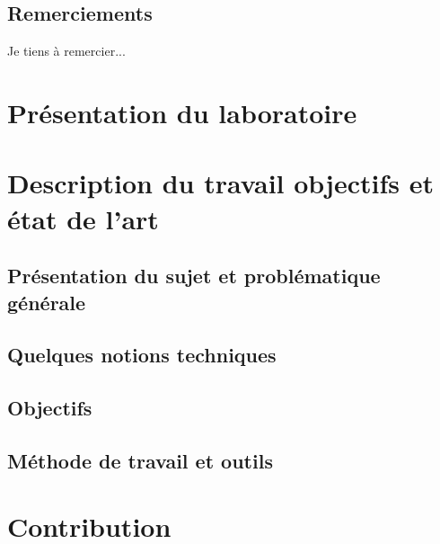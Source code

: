 \documentclass[11pt]{report}
\theoremstyle{definition}
\theoremstyle{remark}
\begin{document}
\newpage
\thispagestyle{empty}
\mbox{}

\newpage
\section*{Remerciements}

Je tiens à remercier...
\newpage

\tableofcontents

\newpage

\listoffigures
{}

\newpage

\listoftables
{}

\newpage

\newpage
\chapter{Présentation du laboratoire}


\newpage
\chapter{Description du travail objectifs et état de l'art}
    
    \section{Présentation du sujet et problématique générale}
    
    \newpage
    \section{Quelques notions techniques}
    
    \section{Objectifs}
    
    \section{Méthode de travail et outils}

\newpage
\chapter{Contribution}
    
    \newpage
\end{document}
